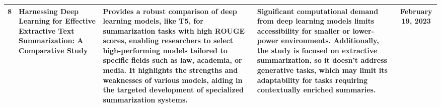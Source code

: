 \documentclass{article}
\begin{document}
\begin{table}[htp]
\begin{tabular}{|c|p{4cm}|p{4cm}|p{4cm}|c|}
8 & Harnessing Deep Learning for Effective Extractive Text Summarization: A Comparative Study & Provides a robust comparison of deep learning models, like T5, for summarization tasks with high ROUGE scores, enabling researchers to select high-performing models tailored to specific fields such as law, academia, or media. It highlights the strengths and weaknesses of various models, aiding in the targeted development of specialized summarization systems. & Significant computational demand from deep learning models limits accessibility for smaller or lower-power environments. Additionally, the study is focused on extractive summarization, so it doesn’t address generative tasks, which may limit its adaptability for tasks requiring contextually enriched summaries. & February 19, 2023 \\ \hline

\end{tabular}
\end{table}

\newpage
\clearpage
\end{document}
